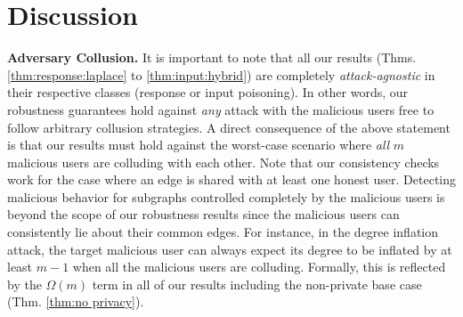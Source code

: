 \section{Discussion}\label{sec:discussion}
\noindent\textbf{Adversary Collusion.} It is important to note that all our results (Thms. \ref{thm:response:laplace} to \ref{thm:input:hybrid}) are completely \textit{attack-agnostic} in their respective classes (response or input poisoning). In other words, our robustness guarantees hold against \textit{any} attack with the malicious users free to follow arbitrary collusion strategies. A direct consequence of the above statement is that our results must hold against the worst-case scenario  where \textit{all} $m$ malicious users are colluding with each other. Note that our consistency checks work for the case where an edge is shared with at least one honest user. Detecting malicious behavior for subgraphs controlled completely by the malicious users is beyond the scope of our robustness results since the malicious users can consistently lie about their common edges. For instance, in the degree inflation attack, the target malicious user can always expect its degree to be inflated by at least $m-1$ when all the malicious users are colluding. Formally, this is reflected by the $\Omega(m)$ term in all of our results including the non-private base case (Thm. \ref{thm:no privacy}).  

